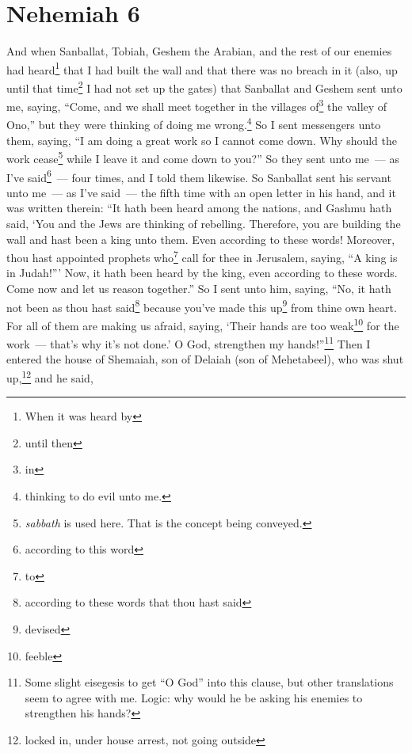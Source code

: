 \section{Nehemiah 6}\label{Nehemiah 6}
\begin{enumerate}[align=center]
     And when Sanballat, Tobiah, Geshem the Arabian, and the rest of our enemies had heard\footnote{When it was heard by} that I had built the wall and that there was no breach in it (also, up until that time\footnote{until then} I had not set up the gates)%
     that Sanballat and Geshem sent unto me, saying, ``Come, and we shall meet together in the villages of\footnote{in} the valley of Ono,'' but they were thinking of doing me wrong.\footnote{thinking to do evil unto me.}%
     So I sent messengers unto them, saying, ``I am doing a great work so I cannot come down. Why should the work cease\footnote{\emph{sabbath} is used here. That is the concept being conveyed.} while I leave it and come down to you?''%
     So they sent unto me~--- as I've said\footnote{according to this word}~--- four times, and I told them likewise.%
     So Sanballat sent his servant unto me~--- as I've said~--- the fifth time with an open letter in his hand,%
     and it was written therein: ``It hath been heard among the nations, and Gashmu hath said, `You and the Jews are thinking of rebelling. Therefore, you are building the wall and hast been a king unto them. Even according to these words!%
     Moreover, thou hast appointed prophets who\footnote{to} call for thee in Jerusalem, saying, ``A king is in Judah!''' Now, it hath been heard by the king, even according to these words. Come now and let us reason together.''%
     So I sent unto him, saying, ``No, it hath not been as thou hast said\footnote{according to these words that thou hast said} because you've made this up\footnote{devised} from thine own heart.%
     For all of them are making us afraid, saying, `Their hands are too weak\footnote{feeble} for the work~--- that's why it's not done.' O God, strengthen my hands!''\footnote{Some slight eisegesis to get ``O God'' into this clause, but other translations seem to agree with me. Logic: why would he be asking his enemies to strengthen his hands?}%
     Then I entered the house of Shemaiah, son of Delaiah (son of Mehetabeel), who was shut up,\footnote{locked in, under house arrest, not going outside} and he said,


\end{enumerate}
